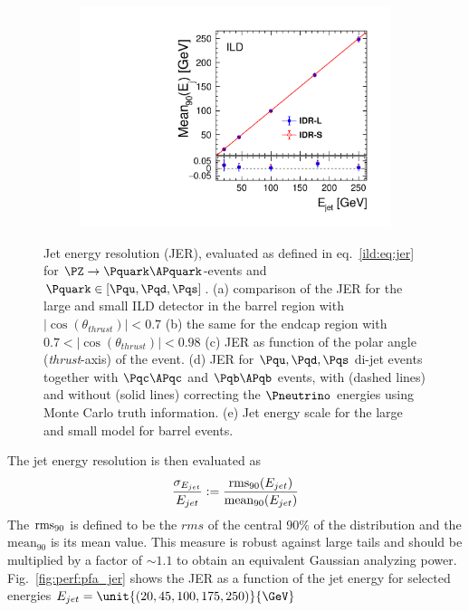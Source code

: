 \begin{figure}[htbp]
\begin{subfigure}{0.49\hsize}
 \includegraphics[width=\hsize]{Performance/fig/JESs_uds_l5_vs_s5.pdf}
 \caption{  \label{fig:perf:pfa_jes}}
 \end{subfigure}
\caption{
  Jet energy resolution (JER), evaluated as defined in eq.~\ref{ild:eq:jer} for $\PZ\rightarrow \Pquark\APquark$-events and $\Pquark \in [\Pqu,\Pqd,\Pqs]$.
  (a) comparison of the JER for the large and small ILD detector in the barrel region with
  $|\cos(\theta_{thrust})|<0.7$  (b) the same for the endcap region with  $0.7<|\cos(\theta_{thrust})|<0.98$
  (c) JER as function of the polar angle ({\em thrust}-axis) of the event. (d) JER for $\Pqu,\Pqd,\Pqs$ di-jet events together with $\Pqc\APqc$ and $\Pqb\APqb$ events,
  with (dashed lines) and without (solid lines) correcting the $\Pneutrino$ energies using Monte Carlo truth information. (e) Jet energy scale for the large and small model
  for barrel events.
  }
\label{fig:perf:pfa}
\end{figure}
%
%
The jet energy resolution is then evaluated as 
\begin{equation}\label{ild:eq:jer}
\frac{ \sigma_{E_{jet}} } { E_{jet}}  :=  \frac{\mathrm{rms}_{90}(E_{jet})}{ \mathrm{mean}_{90}(E_{jet})}
\end{equation}
The $\mathrm{rms}_{90}$ is defined to be the $rms$ of the central $90\%$ of the distribution and the $\mathrm{mean}_{90}$ is its mean value.
This measure is robust against large tails and
should be multiplied by a factor of $\sim1.1$ to obtain an equivalent Gaussian analyzing power\cite{ild:bib:PandoraPFA}.
Fig.~\ref{fig:perf:pfa_jer} shows the JER as a function of the jet energy for selected energies $E_{jet}=\unit{(20, 45, 100, 175, 250)}{\GeV}$
